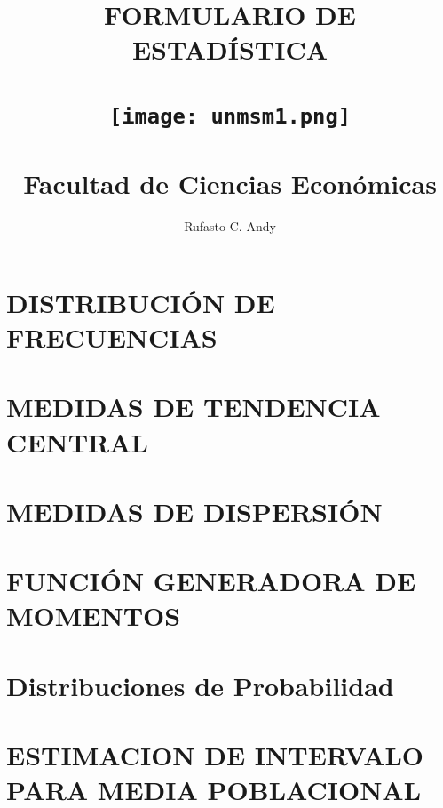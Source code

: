 \documentclass[15pt]{report}
\title{
        {\sc \bf \color{usm} FORMULARIO DE ESTADÍSTICA} 
        \\
        {\vfill}
        \\
        {\texttt{[image: unmsm1.png]}}
        \\
        {}
        \\
        {Facultad de Ciencias Económicas}
       }
\author{Rufasto C. Andy}
\date{}
\begin{document}
\maketitle


\tableofcontents
        \begingroup
        \Large
    \chapter{ \color{usm} DISTRIBUCIÓN DE FRECUENCIAS}
            
    
    \chapter{ \color{usm}MEDIDAS DE TENDENCIA CENTRAL}
            
            
    \chapter{\color{usm}MEDIDAS DE DISPERSIÓN}
            
    
    \chapter{\color{usm}FUNCIÓN GENERADORA DE MOMENTOS}
            
            
    \chapter{\color{usm}Distribuciones de Probabilidad}
            
            
            
    \chapter{\color{usm}ESTIMACION DE INTERVALO PARA MEDIA POBLACIONAL}
            
            
            
        \endgroup
\end{document}

